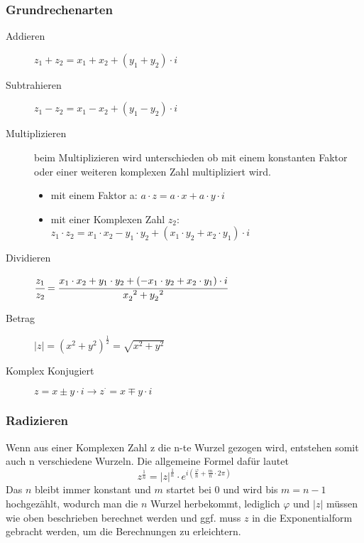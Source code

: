 \documentclass[a4paper]{scrartcl}
\begin{document}
            \subsubsection{Grundrechenarten}
                \begin{description}
                    \item[Addieren] $z_1 + z_2 = x_1 + x_2 + (y_1 + y_2) \cdot i$ 
                    \item[Subtrahieren] $z_1 - z_2 = x_1 - x_2 + (y_1 - y_2) \cdot i$ 
                    \item[Multiplizieren] beim Multiplizieren wird unterschieden ob mit einem konstanten Faktor oder einer weiteren komplexen Zahl multipliziert wird.
                    \begin{itemize}
                        \item mit einem Faktor a: $a  \cdot  z = a  \cdot  x + a  \cdot  y  \cdot  i $
                        \item mit einer Komplexen Zahl $z_2$: $z_1  \cdot  z_2 = x_1  \cdot  x_2 - y_1  \cdot  y_2 + (x_1  \cdot  y_2 + x_2  \cdot  y_1)  \cdot  i $
                    \end{itemize}  
                    \item[Dividieren]  $\cfrac{z_1}{z_2} = \cfrac{x_1 \cdot x_2 + y_1 \cdot y_2 + (-x_1 \cdot y_2 + x_2 \cdot y_1) \cdot i}{x_2^{\;\;2} + y_2^{\;\;2}}$
                    \item[Betrag] $|z| = (x^2 + y^2)^\frac{1}{2} = \sqrt{x^2 + y^2}$ 
                    \item[Komplex Konjugiert] $z = x \pm y \cdot i \rightarrow z^ \cdot  = x \mp y \cdot i$ 
                \end{description}
                
            \subsubsection{Radizieren}
            Wenn aus einer Komplexen Zahl z die n-te Wurzel gezogen wird, entstehen somit auch n verschiedene Wurzeln.
            Die allgemeine Formel dafür lautet 
            \begin{equation*}
                z^{\frac{1}{n}} = |z|^{\frac{1}{n}}  \cdot  e^{i(\frac{\varphi}{n} + \frac{m}{n} \cdot  2\pi)}
            \end{equation*}
            Das $n$ bleibt immer konstant und $m$ startet bei 0 und wird bis $m = n-1$ hochgezählt, wodurch man die $n$ Wurzel herbekommt,
            lediglich $\varphi$ und $|z|$ müssen wie oben beschrieben berechnet werden und ggf. muss $z$ in die Exponentialform gebracht werden, um die Berechnungen zu erleichtern.  
        \newpage
\end{document}
